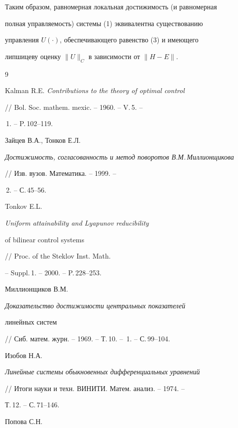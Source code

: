 Таким образом, равномерная локальная достижимость (и равномерная


полная управляемость) системы (1) эквивалентна существованию


управления $U(\cdot)$, обеспечивающего равенство (3) и имеющего


липшицеву оценку $\|U\|_C$ в зависимости от $\|H-E\|$.








\begin{thebibliography}{9}





\bibitem{}


Kalman R.E. {\em Contributions to the theory of optimal control}


// Bol. Soc. mathem. mexic. -- 1960. -- V.\,5. --


\No\,1. -- P.\,102--119.




Зайцев В.А., Тонков Е.Л.


{\em Достижимость, согласованность и метод поворотов В.М.\,Миллионщикова}


// Изв. вузов. Математика. -- 1999. --


\No\,2. -- С.\,45--56.




Tonkov E.L. {\em Uniform attainability and Lyapunov reducibility


of bilinear control systems} // Proc. of the Steklov Inst. Math.


-- Suppl.\,1. -- 2000. -- P.\,228--253.




Миллионщиков В.М.


{\em Доказательство достижимости центральных показателей


линейных систем}


// Сиб. матем. журн. -- 1969. -- Т.\,10. -- \No\,1. -- С.\,99--104.




Изобов Н.А.


{\em Линейные системы обыкновенных дифференциальных уравнений}


// Итоги науки и техн. ВИНИТИ. Матем. анализ. -- 1974. --


Т.\,12. -- С.\,71--146.




Попова С.Н.



\end{thebibliography}
